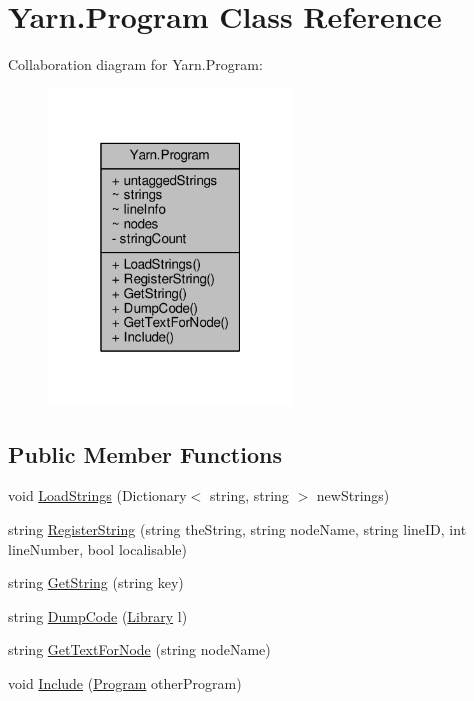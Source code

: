 \hypertarget{a00126}{\section{Yarn.\-Program Class Reference}
\label{a00126}
}


Collaboration diagram for Yarn.\-Program\-:
\nopagebreak
\begin{figure}[H]
\begin{center}
\leavevmode
\includegraphics[width=184pt]{d0/de7/a00523}
\end{center}
\end{figure}
\subsection*{Public Member Functions}
\begin{DoxyCompactItemize}
\item 
void \hyperlink{a00126_a977d1ed02e3f6f39d30dfea1663e7927}{Load\-Strings} (Dictionary$<$ string, string $>$ new\-Strings)
\item 
string \hyperlink{a00126_a9baf491479375aa8c3aa2b0c31cf0932}{Register\-String} (string the\-String, string node\-Name, string line\-I\-D, int line\-Number, bool localisable)
\item 
string \hyperlink{a00126_a14737b93594c4aab25c59cb0a3c918f7}{Get\-String} (string key)
\item 
string \hyperlink{a00126_a2f5bb468ce53eb7bbe647e3c11ddbb61}{Dump\-Code} (\hyperlink{a00103}{Library} l)
\item 
string \hyperlink{a00126_aad8029f37832ff1985fad6a31e51afd8}{Get\-Text\-For\-Node} (string node\-Name)
\item 
void \hyperlink{a00126_afd3385ca1f7589b3b9dae3646e4fee84}{Include} (\hyperlink{a00126}{Program} other\-Program)
\end{DoxyCompactItemize}
